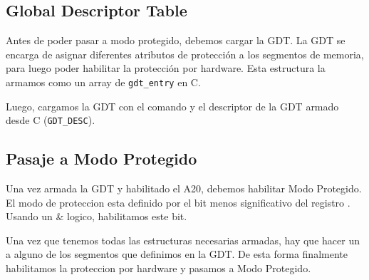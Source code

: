 \subsection{Global Descriptor Table}
Antes de poder pasar a modo protegido, debemos cargar la GDT. La GDT se encarga de asignar diferentes atributos de protección a los segmentos de memoria, para luego poder habilitar la protección por hardware. Esta estructura la armamos como un array de \texttt{gdt\_entry} en C.

Luego, cargamos la GDT con el comando  y el descriptor de la GDT armado desde C (\texttt{GDT\_DESC}).

\subsection{Pasaje a Modo Protegido}
Una vez armada la GDT y habilitado el A20, debemos habilitar Modo Protegido. El modo de proteccion esta definido por el bit menos significativo del registro . Usando un \& logico, habilitamos este bit.

Una vez que tenemos todas las estructuras necesarias armadas, hay que hacer un  a alguno de los segmentos que definimos en la GDT. De esta forma finalmente habilitamos la proteccion por hardware y pasamos a Modo Protegido. 

